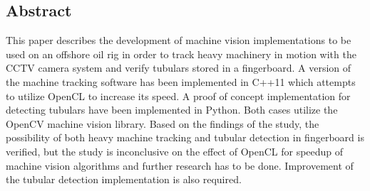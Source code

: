 \subsection*{Abstract}
This paper describes the development of machine vision implementations to be used on an offshore oil rig in order to track heavy machinery in motion with the CCTV camera system and verify tubulars stored in a fingerboard. A version of the machine tracking software has been implemented in C++11 which attempts to utilize OpenCL to increase its speed. A proof of concept implementation for detecting tubulars have been implemented in Python. Both cases utilize the OpenCV machine vision library. Based on the findings of the study, the possibility of both heavy machine tracking and tubular detection in fingerboard is verified, but the study is inconclusive on the effect of OpenCL for speedup of machine vision algorithms and further research has to be done. Improvement of the tubular detection implementation is also required.
\newpage